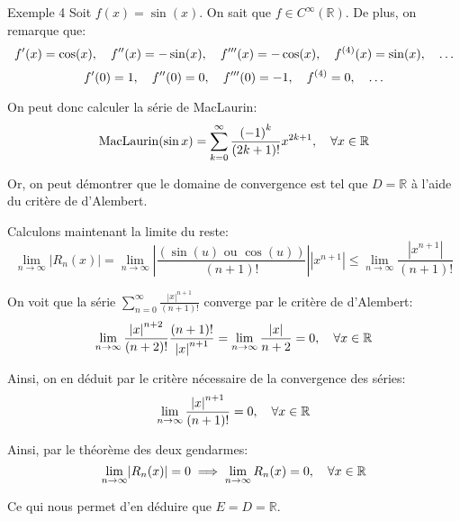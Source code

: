 \documentclass[a4paper]{article}
\begin{document}
\begin{parag}{Exemple 4}
    Soit $f\left(x\right) = \sin\left(x\right)$. On sait que $f \in C^{\infty}\left(\mathbb{R}\right)$. De plus, on remarque que: 
    \[f'\left(x\right) = \cos\left(x\right), \mathspace f''\left(x\right) = -\sin\left(x\right), \mathspace f'''\left(x\right) = -\cos\left(x\right), \mathspace f^{\left(4\right)}\left(x\right) = \sin\left(x\right), \mathspace \ldots\]
    \[f'\left(0\right) = 1, \mathspace f''\left(0\right) = 0, \mathspace f'''\left(0\right) = -1, \mathspace f^{\left(4\right)} = 0, \mathspace \ldots\]

    On peut donc calculer la série de MacLaurin: 
    \[\MacLaurin\left(\sin x\right) = \sum_{k=0}^{\infty} \frac{\left(-1\right)^k}{\left(2k + 1\right)!} x^{2k + 1}, \mathspace \forall x \in \mathbb{R}\]

    Or, on peut démontrer que le domaine de convergence est tel que $D = \mathbb{R}$ à l'aide du critère de d'Alembert.

    Calculons maintenant la limite du reste: 
    \[\lim_{n \to \infty} \left|R_n\left(x\right)\right| = \lim_{n \to \infty} \left|\frac{\left(\sin\left(u\right) \text{ ou } \cos\left(u\right)\right)}{\left(n+1\right)!}\right| \left|x^{n+1}\right| \leq \lim_{n \to \infty} \frac{\left|x^{n+1}\right|}{\left(n+1\right)!}\]
    
    On voit que la série $\sum_{n=0}^{\infty} \frac{\left|x\right|^{n+1}}{\left(n+1\right)!}$ converge par le critère de d'Alembert: 
    \[\lim_{n \to \infty} \frac{\left|x\right|^{n+2}}{\left(n+2\right)!} \frac{\left(n+1\right)!}{\left|x\right|^{n+1}} = \lim_{n \to \infty} \frac{\left|x\right|}{n+2} = 0, \mathspace \forall x \in \mathbb{R}\]
    
    Ainsi, on en déduit par le critère nécessaire de la convergence des séries: 
    \[\lim_{n \to \infty} \frac{\left|x\right|^{n+1}}{\left(n+1\right)!} = 0, \mathspace \forall x\in \mathbb{R}\]
    
    Ainsi, par le théorème des deux gendarmes: 
    \[\lim_{n \to \infty} \left|R_n\left(x\right)\right| = 0 \implies \lim_{n \to \infty} R_n\left(x\right) = 0, \mathspace \forall x \in \mathbb{R}\]
    
    Ce qui nous permet d'en déduire que $E = D = \mathbb{R}$.
    
\end{parag}
\end{document}
